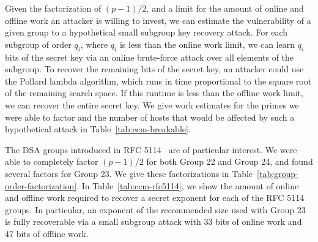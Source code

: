 Given the factorization of $(p-1)/2$, and a limit for the amount of online and
offline work an attacker is willing to invest, we can estimate the
vulnerability of a given group to a hypothetical small subgroup key recovery
attack. For each subgroup of order $q_i$, where $q_i$ is less than the online
work limit, we can learn $q_i$ bits of the secret key via an online brute-force
attack over all elements of the subgroup. To recover the remaining bits of the
secret key, an attacker could use the Pollard lambda algorithm, which runs in
time proportional to the square root of the remaining search space. If this
runtime is less than the offline work limit, we can recover the entire secret
key. We give work estimates for the primes we were able to factor and the
number of hosts that would be affected by such a hypothetical attack in
Table~\ref{tab:ecm-breakable}.

The DSA groups introduced in RFC 5114~\cite{rfc5114} are of particular
interest. We were able to completely factor $(p-1)/2$ for both Group 22 and
Group 24, and found several factors for Group 23. We give these factorizations
in Table~\ref{tab:group-order-factorization}.
In Table~\ref{tab:ecm-rfc5114}, we show the amount of online and offline work
required to recover a secret exponent for each of the RFC 5114 groups. In
particular, an exponent of the recommended size used with Group 23 is fully
recoverable via a small subgroup attack with 33 bits of online work and 47 bits
of offline work.

\ECMDistributionTable

\GroupOrderFactorization
